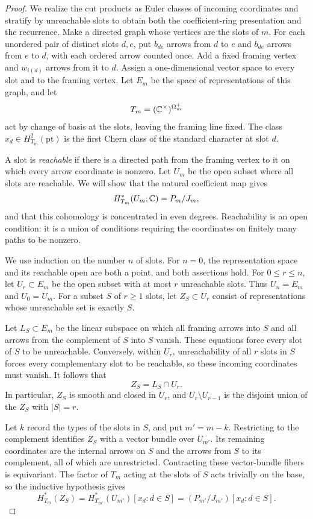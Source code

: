 \begin{proof}
We realize the cut products as Euler classes of incoming coordinates and
stratify by unreachable slots to obtain both the coefficient-ring
presentation and the recurrence.  Make a directed graph whose vertices
are the slots of $m$.
For each unordered pair of distinct slots $d,e$, put $b_{de}$ arrows from $d$ to $e$
and $b_{de}$ arrows from $e$ to $d$, with each ordered arrow counted once.
Add a fixed framing vertex and $w_{i(d)}$ arrows from it to $d$.
Assign a one-dimensional vector space to every slot and to the framing
vertex.  Let $E_m$ be the space of representations of this graph, and let
\[
 T_m=(\mathbb C^\times)^{\Omega_m^+}
\]
act by change of basis at the slots, leaving the framing line fixed.  The
class $x_d\in H_{T_m}^2(\mathrm{pt})$ is the first Chern class of the standard
character at slot $d$.

A slot is \emph{reachable} if there is a directed path from the framing
vertex to it on which every arrow coordinate is nonzero.  Let $U_m$ be the
open subset where all slots are reachable.  We will show that the natural
coefficient map gives
\begin{equation}\label{eq:cut-cohomology}
 H_{T_m}^*(U_m;\mathbb C)=P_m/J_m,
\end{equation}
and that this cohomology is concentrated in even degrees.  Reachability is
an open condition: it is a union of conditions requiring the coordinates
on finitely many paths to be nonzero.

We use induction on the number $n$ of slots.  For $n=0$, the representation
space and its reachable open are both a point, and both assertions hold.
For $0\leq r\leq n$, let $U_r\subset E_m$ be the open subset with at most
$r$ unreachable slots.  Thus $U_n=E_m$ and $U_0=U_m$.  For a subset $S$ of
$r\geq1$ slots, let $Z_S\subset U_r$ consist of representations whose
unreachable set is exactly $S$.

Let $L_S\subset E_m$ be the linear subspace on which all framing arrows
into $S$ and all arrows from the complement of $S$ into $S$ vanish.  These
equations force every slot of $S$ to be unreachable.  Conversely, within
$U_r$, unreachability of all $r$ slots in $S$ forces every complementary
slot to be reachable, so these incoming coordinates must vanish.  It follows that
\[
 Z_S=L_S\cap U_r.
\]
In particular, $Z_S$ is smooth and closed in $U_r$, and
$U_r\setminus U_{r-1}$ is the disjoint union of the $Z_S$ with $|S|=r$.

Let $k$ record the types of the slots in $S$, and put $m'=m-k$.  Restricting
to the complement identifies $Z_S$ with a vector bundle over $U_{m'}$.
Its remaining coordinates are the internal arrows on $S$ and the arrows
from $S$ to its complement, all of which are unrestricted.  Contracting
these vector-bundle fibers is equivariant.  The factor of $T_m$ acting at
the slots of $S$ acts trivially on the base, so the inductive hypothesis
gives
\begin{equation}\label{eq:cut-stratum-cohomology}
 H_{T_m}^*(Z_S)
 =H_{T_{m'}}^*(U_{m'})[x_d:d\in S]
 =(P_{m'}/J_{m'})[x_d:d\in S].
\end{equation}


\end{proof}
